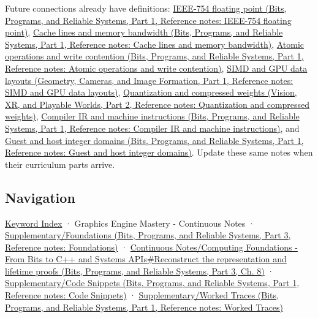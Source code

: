 Future connections already have definitions: \href{../01-Bits-Programs-and-Reliable-Systems-P01/main.pdf\#appendix-343615f49ddf}{IEEE-754 floating point (Bits, Programs, and Reliable Systems, Part 1, Reference notes: IEEE-754 floating point)}, \href{../01-Bits-Programs-and-Reliable-Systems-P01/main.pdf\#appendix-e4ccdbab8320}{Cache lines and memory bandwidth (Bits, Programs, and Reliable Systems, Part 1, Reference notes: Cache lines and memory bandwidth)}, \href{../01-Bits-Programs-and-Reliable-Systems-P01/main.pdf\#appendix-e12d1b03fefb}{Atomic operations and write contention (Bits, Programs, and Reliable Systems, Part 1, Reference notes: Atomic operations and write contention)}, \href{../03-Geometry-Cameras-and-Image-Formation-P01/main.pdf\#appendix-3c7b1a56de01}{SIMD and GPU data layouts (Geometry, Cameras, and Image Formation, Part 1, Reference notes: SIMD and GPU data layouts)}, \href{../07-Vision-XR-and-Playable-Worlds-P02/main.pdf\#appendix-fdc7879e8bf2}{Quantization and compressed weights (Vision, XR, and Playable Worlds, Part 2, Reference notes: Quantization and compressed weights)}, \href{../01-Bits-Programs-and-Reliable-Systems-P01/main.pdf\#appendix-942ad41afb30}{Compiler IR and machine instructions (Bits, Programs, and Reliable Systems, Part 1, Reference notes: Compiler IR and machine instructions)}, and \href{../01-Bits-Programs-and-Reliable-Systems-P01/main.pdf\#appendix-33e7a011b684}{Guest and host integer domains (Bits, Programs, and Reliable Systems, Part 1, Reference notes: Guest and host integer domains)}. Update these same notes when their curriculum parts arrive.

\subsection{Navigation}\label{appendix-4ad47bdd269a-navigation}

\hypertarget{appendix-4ad47bdd269a-navigation}{}

\hyperref[appendix-a6d556a4ef50]{Keyword Index} · {Graphics Engine Mastery - Continuous Notes} · \href{../01-Bits-Programs-and-Reliable-Systems-P03/main.pdf\#appendix-fd090d982a15}{Supplementary/Foundations (Bits, Programs, and Reliable Systems, Part 3, Reference notes: Foundations)} · \href{../01-Bits-Programs-and-Reliable-Systems-P03/main.pdf\#01-foundations-i-ch010-reconstruct-the-representation-and-lifetime-proofs}{Continuous Notes/Computing Foundations - From Bits to C++ and Systems APIs\#Reconstruct the representation and lifetime proofs (Bits, Programs, and Reliable Systems, Part 3, Ch. 8)} · \href{../01-Bits-Programs-and-Reliable-Systems-P01/main.pdf\#appendix-4e2236f53445}{Supplementary/Code Snippets (Bits, Programs, and Reliable Systems, Part 1, Reference notes: Code Snippets)} · \href{../01-Bits-Programs-and-Reliable-Systems-P01/main.pdf\#appendix-92ff77d4dfdc}{Supplementary/Worked Traces (Bits, Programs, and Reliable Systems, Part 1, Reference notes: Worked Traces)}

